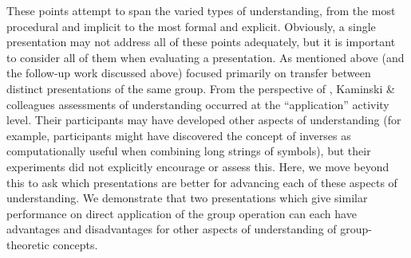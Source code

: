 \documentclass[man,10pt]{apa6}
\begin{document}
These points attempt to span the varied types of understanding, from the most procedural and implicit to the most formal and explicit. Obviously, a single presentation may not address all of these points adequately, but it is important to consider all of them when evaluating a presentation. As mentioned above  (and the follow-up work discussed above) focused primarily on transfer between distinct presentations of the same group. From the perspective of , Kaminski \& colleagues assessments of understanding occurred at the ``application'' activity level. Their participants may have developed other aspects of understanding (for example, participants might have discovered the concept of inverses as computationally useful when combining long strings of symbols), but their experiments did not explicitly encourage or assess this. Here, we move beyond this to ask which presentations are better for advancing each of these aspects of understanding. We demonstrate that two presentations which give similar performance on direct application of the group operation can each have advantages and disadvantages for other aspects of understanding of group-theoretic concepts.\par
\end{document}
